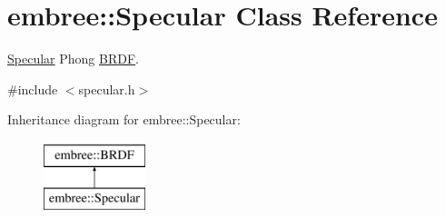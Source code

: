 \hypertarget{classembree_1_1_specular}{
\section{embree::Specular Class Reference}
\label{classembree_1_1_specular}
}


\hyperlink{classembree_1_1_specular}{Specular} Phong \hyperlink{classembree_1_1_b_r_d_f}{BRDF}.  




{\ttfamily \#include $<$specular.h$>$}

Inheritance diagram for embree::Specular:\begin{figure}[H]
\begin{center}
\leavevmode
\includegraphics[height=2.000000cm]{classembree_1_1_specular}
\end{center}
\end{figure}
